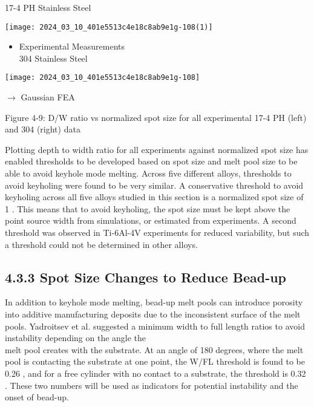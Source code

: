 \documentclass[10pt]{article}
\begin{document}
17-4 PH Stainless Steel

\begin{center}
\texttt{[image: 2024\_03\_10\_401e5513c4e18c8ab9e1g-108(1)]}
\end{center}

\begin{itemize}
  \item Experimental Measurements\\
304 Stainless Steel
\end{itemize}

\begin{center}
\texttt{[image: 2024\_03\_10\_401e5513c4e18c8ab9e1g-108]}
\end{center}

$\rightarrow$ Gaussian FEA

Figure 4-9: D/W ratio vs normalized spot size for all experimental 17-4 PH (left) and 304 (right) data

Plotting depth to width ratio for all experiments against normalized spot size has enabled thresholds to be developed based on spot size and melt pool size to be able to avoid keyhole mode melting. Across five different alloys, thresholds to avoid keyholing were found to be very similar. A conservative threshold to avoid keyholing across all five alloys studied in this section is a normalized spot size of 1 . This means that to avoid keyholing, the spot size must be kept above the point source width from simulations, or estimated from experiments. A second threshold was observed in Ti-6Al-4V experiments for reduced variability, but such a threshold could not be determined in other alloys.

\subsection*{4.3.3 Spot Size Changes to Reduce Bead-up}
In addition to keyhole mode melting, bead-up melt pools can introduce porosity into additive manufacturing deposits due to the inconsistent surface of the melt pools. Yadroitsev et al. suggested a minimum width to full length ratios to avoid instability depending on the angle the\\
melt pool creates with the substrate. At an angle of 180 degrees, where the melt pool is contacting the substrate at one point, the W/FL threshold is found to be 0.26 , and for a free cylinder with no contact to a substrate, the threshold is 0.32 . These two numbers will be used as indicators for potential instability and the onset of bead-up.
\end{document}

